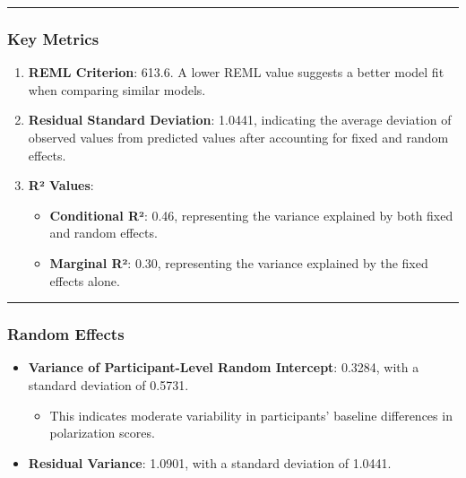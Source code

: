 \documentclass[
]{article}
\providecommand{\tightlist}{%
  \setlength{\itemsep}{0pt}\setlength{\parskip}{0pt}}
\begin{document}
\begin{center}\rule{0.5\linewidth}{0.5pt}\end{center}

\subsubsection{\texorpdfstring{\textbf{Key
Metrics}}{Key Metrics}}\label{key-metrics-2}

\begin{enumerate}
\def\labelenumi{\arabic{enumi}.}
\tightlist
\item
  \textbf{REML Criterion}: 613.6. A lower REML value suggests a better
  model fit when comparing similar models.
\item
  \textbf{Residual Standard Deviation}: 1.0441, indicating the average
  deviation of observed values from predicted values after accounting
  for fixed and random effects.
\item
  \textbf{R² Values}:

  \begin{itemize}
  \tightlist
  \item
    \textbf{Conditional R²}: 0.46, representing the variance explained
    by both fixed and random effects.
  \item
    \textbf{Marginal R²}: 0.30, representing the variance explained by
    the fixed effects alone.
  \end{itemize}
\end{enumerate}

\begin{center}\rule{0.5\linewidth}{0.5pt}\end{center}

\subsubsection{\texorpdfstring{\textbf{Random
Effects}}{Random Effects}}\label{random-effects-2}

\begin{itemize}
\tightlist
\item
  \textbf{Variance of Participant-Level Random Intercept}: 0.3284, with
  a standard deviation of 0.5731.

  \begin{itemize}
  \tightlist
  \item
    This indicates moderate variability in participants' baseline
    differences in polarization scores.
  \end{itemize}
\item
  \textbf{Residual Variance}: 1.0901, with a standard deviation of
  1.0441.
\end{itemize}
\end{document}
